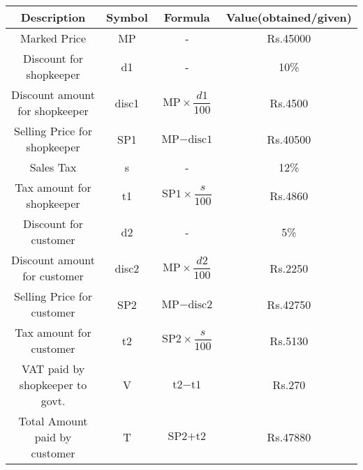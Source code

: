 \begin{center}
    \begin{tabular}{|c|c|c|c|}
       \hline
       \textbf{Description}  & \textbf{Symbol} &  \textbf{Formula}  &  \textbf{Value(obtained/given)} \\
       \hline
       \hline
       Marked Price & MP & - & Rs.45000 \\  
       \hline
       Discount for shopkeeper & d1 & - & 10\% \\
       \hline
       Discount amount for shopkeeper & disc1 & $\text{MP}\times\dfrac{d1}{100}$ & Rs.4500\\
       \hline
       Selling Price for shopkeeper & SP1 & $\text{MP} -  \text{disc1}$ & Rs.40500 \\
       \hline
       Sales Tax & s & - & 12\% \\
       \hline
       Tax amount for shopkeeper & t1 & $\text{SP1}\times\dfrac{s}{100}$ & Rs.4860\\
       \hline
       Discount for customer & d2 & - & 5\% \\
       \hline
       Discount amount for customer & disc2 & $\text{MP}\times\dfrac{d2}{100}$ & Rs.2250 \\
       \hline
       Selling Price for customer & SP2 & $\text{MP} - \text{disc2}$ & Rs.42750 \\
       \hline
       Tax amount for customer & t2 & $\text{SP2}\times\dfrac{s}{100}$ & Rs.5130\\
       \hline
       VAT paid by shopkeeper to govt. & V & $\text{t2} - \text{t1}$ & Rs.270\\
       \hline
       Total Amount paid by customer & T & $\text{SP2} + \text{t2}$ & Rs.47880\\
       \hline
       
    \end{tabular}
\end{center}
